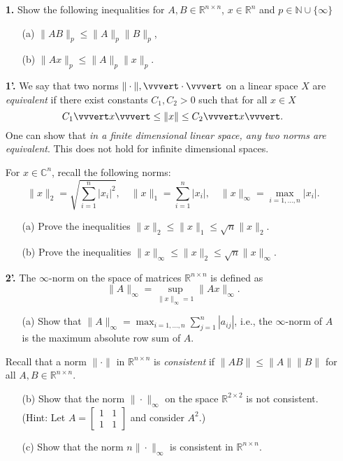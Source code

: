 \documentclass[10pt]{report}
\begin{document}
\begin{enumerate}
  \item[\textbf{1.}]Show the following inequalities for $A,
  B\in\mathbb{R}^{n\times n}$, $x\in\mathbb{R}^n$ and 
  $p\in\mathbb{N}\cup\{\infty\}$
\begin{enumerate}
  \item[(a)]$\|AB\|_p\leq\|A\|_p\|B\|_p$,
  \item[(b)]$\|Ax\|_p\leq\|A\|_p\|x\|_p$.
\end{enumerate}

\vspace{0.7cm}


\item[\textbf{1'.}]
We say that two norms $\| \cdot \|, \vvvert \cdot \vvvert$ on a linear space $X$ are \textit{equivalent} if there exist constants $C_1, C_2 > 0$ such that for all $x \in X$
\[C_1 \vvvert x \vvvert \leq \|x\| \leq  C_2\vvvert x\vvvert.\]
One can show that \textit{in a finite dimensional linear space, any two norms are equivalent}. This does not hold for infinite dimensional spaces.

For $x \in \mathbb{C}^{n}$, recall the following norms: 
\[
\|x\|_2 =\sqrt{\sum_{i=1}^n |x_i|^2},\quad
\|x\|_1 = \sum_{i=1}^n |x_i|,\quad
\|x\|_{\infty} = \max_{i=1, \ldots,n}|x_i|.
\]

\begin{enumerate}
  \item[(a)]Prove the inequalities  $\|x\|_2 \leq \|x\|_1 \leq \sqrt{n}\|x\|_2$.
  \item[(b)]Prove the inequalities  $ \|x\|_\infty \leq \|x\|_2 \leq  \sqrt{n}\|x\|_{\infty}$.
\end{enumerate}



\item[\textbf{2'.}] The $\infty$-norm on the space of matrices $\mathbb{R}^{n \times n}$ is defined as
\[\|A\|_{\infty}= \sup_{\|x\|_{\infty}=1} \|Ax\|_{\infty}.\]
\begin{enumerate} 
\item[(a)] Show that $\|A\|_{\infty}= \displaystyle{\max_{i=1, \ldots, n}}\sum_{j=1}^n |a_{ij}|$, i.e., the $\infty$-norm of $A$ is the maximum absolute row sum of $A$.
\end{enumerate}
Recall that a norm $\|\cdot\|$ in $\mathbb{R}^{n \times n}$ is \textit{consistent} if $\|AB\| \leq \|A\| \|B\|$ for all $A, B \in \mathbb{R}^{n \times n}$. 
\begin{enumerate} 
\item[(b)]Show that the norm $\|\cdot\|_\infty$ on the  space $\mathbb{R}^{2 \times 2}$ is not consistent.
(Hint: Let $A= \left[\begin{smallmatrix} 1&1\\1&1 \end{smallmatrix}\right]$ and consider $A^2$.)
\item[(c)] Show that the norm $n\|\cdot\|_{\infty}$ is consistent in $\mathbb{R}^{n \times n}$.
\end{enumerate}





\end{enumerate}
\end{document}

